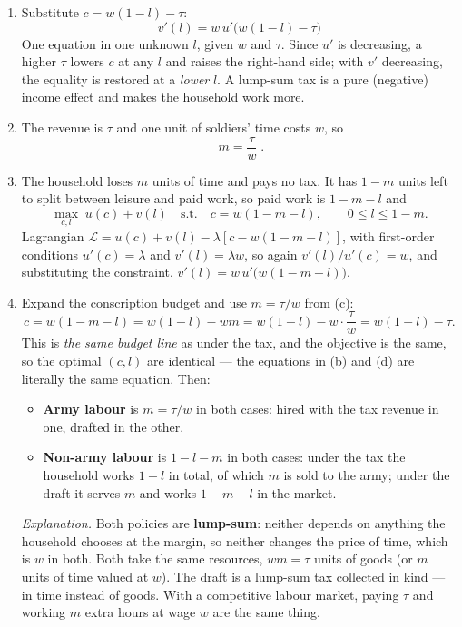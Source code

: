\documentclass[12pt, letterpaper]{article}
\begin{document}
\begin{tcolorbox}[evenbox,title={Problem 7.2 \quad Military Service}]
\begin{enumerate}
\item Substitute $c=w(1-l)-\tau$:
\[
\boxed{\;v'(l)=w\,u'\!\big(w(1-l)-\tau\big)\;}
\]
One equation in one unknown $l$, given $w$ and $\tau$. Since $u'$ is decreasing, a higher
$\tau$ lowers $c$ at any $l$ and raises the right-hand side; with $v'$ decreasing, the
equality is restored at a \emph{lower} $l$. A lump-sum tax is a pure (negative) income effect
and makes the household work more.

\item The revenue is $\tau$ and one unit of soldiers' time costs $w$, so
\[
\boxed{\;m=\frac{\tau}{w}\;}.
\]

\item The household loses $m$ units of time and pays no tax. It has $1-m$ units left to
split between leisure and paid work, so paid work is $1-m-l$ and
\[
\max_{c,l}\;u(c)+v(l)
\quad\text{s.t.}\quad c=w(1-m-l),\qquad 0\le l\le1-m .
\]
Lagrangian $\mathcal L=u(c)+v(l)-\lambda[c-w(1-m-l)]$, with first-order conditions
$u'(c)=\lambda$ and $v'(l)=\lambda w$, so again $v'(l)/u'(c)=w$, and substituting the
constraint, $v'(l)=w\,u'\big(w(1-m-l)\big)$.

\item Expand the conscription budget and use $m=\tau/w$ from (c):
\[
c=w(1-m-l)=w(1-l)-wm=w(1-l)-w\cdot\frac{\tau}{w}=w(1-l)-\tau .
\]
This is \emph{the same budget line} as under the tax, and the objective is the same, so the
optimal $(c,l)$ are identical --- the equations in (b) and (d) are literally the same
equation. Then:
\begin{itemize}
\item \textbf{Army labour} is $m=\tau/w$ in both cases: hired with the tax revenue in one,
drafted in the other.
\item \textbf{Non-army labour} is $1-l-m$ in both cases: under the tax the household works
$1-l$ in total, of which $m$ is sold to the army; under the draft it serves $m$ and works
$1-m-l$ in the market.
\end{itemize}

\emph{Explanation.} Both policies are \textbf{lump-sum}: neither depends on anything the
household chooses at the margin, so neither changes the price of time, which is $w$ in both.
Both take the same resources, $wm=\tau$ units of goods (or $m$ units of time valued at $w$).
The draft is a lump-sum tax collected in kind --- in time instead of goods. With a
competitive labour market, paying $\tau$ and working $m$ extra hours at wage $w$ are the
same thing.
\end{enumerate}


\end{tcolorbox}
\end{document}
